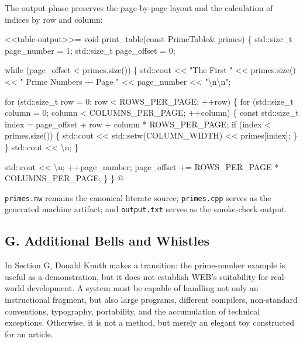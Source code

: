 \documentclass{ZGJournalArticle_2026}
\newenvironment{Shaded}{}{}
\newcommand{\NormalTok}[1]{#1}
\begin{document}
The output phase preserves the page-by-page layout and the calculation
of indices by row and column:

\begin{Shaded}
\begin{Highlighting}[]
\NormalTok{\textless{}\textless{}table{-}output\textgreater{}\textgreater{}=}
\NormalTok{void print\_table(const PrimeTable\& primes) \{}
\NormalTok{    std::size\_t page\_number = 1;}
\NormalTok{    std::size\_t page\_offset = 0;}

\NormalTok{    while (page\_offset \textless{} primes.size()) \{}
\NormalTok{        std::cout \textless{}\textless{} "The First " \textless{}\textless{} primes.size()}
\NormalTok{                  \textless{}\textless{} " Prime Numbers {-}{-}{-} Page " \textless{}\textless{} page\_number \textless{}\textless{} "\textbackslash{}n\textbackslash{}n";}

\NormalTok{        for (std::size\_t row = 0; row \textless{} ROWS\_PER\_PAGE; ++row) \{}
\NormalTok{            for (std::size\_t column = 0; column \textless{} COLUMNS\_PER\_PAGE; ++column) \{}
\NormalTok{                const std::size\_t index = page\_offset + row + column * ROWS\_PER\_PAGE;}
\NormalTok{                if (index \textless{} primes.size()) \{}
\NormalTok{                    std::cout \textless{}\textless{} std::setw(COLUMN\_WIDTH) \textless{}\textless{} primes[index];}
\NormalTok{                \}}
\NormalTok{            \}}
\NormalTok{            std::cout \textless{}\textless{} \textquotesingle{}\textbackslash{}n\textquotesingle{};}
\NormalTok{        \}}

\NormalTok{        std::cout \textless{}\textless{} \textquotesingle{}\textbackslash{}n\textquotesingle{};}
\NormalTok{        ++page\_number;}
\NormalTok{        page\_offset += ROWS\_PER\_PAGE * COLUMNS\_PER\_PAGE;}
\NormalTok{    \}}
\NormalTok{\}}
\NormalTok{@}
\end{Highlighting}
\end{Shaded}

\texttt{primes.nw} remains the canonical literate source;
\texttt{primes.cpp} serves as the generated machine artifact; and
\texttt{output.txt} serves as the smoke-check output.

\subsection{G. Additional Bells and
Whistles}\label{g.-additional-bells-and-whistles}

In Section G, Donald Knuth makes a transition: the prime-number example
is useful as a demonstration, but it does not establish WEB's
suitability for real-world development. A system must be capable of
handling not only an instructional fragment, but also large programs,
different compilers, non-standard conventions, typography, portability,
and the accumulation of technical exceptions. Otherwise, it is not a
method, but merely an elegant toy constructed for an article.
\end{document}
